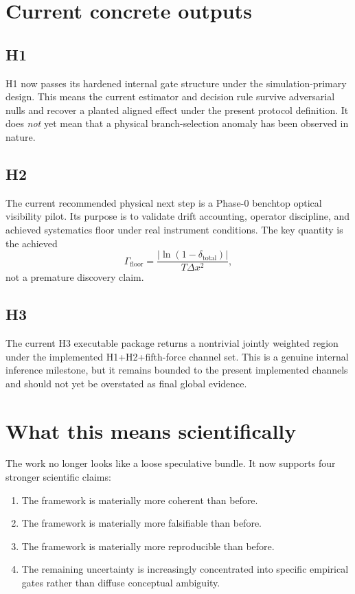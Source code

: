 \documentclass[11pt]{article}
\begin{document}
\section{Current concrete outputs}
\subsection*{H1}
H1 now passes its hardened internal gate structure under the simulation-primary design. This means the current estimator and decision rule survive adversarial nulls and recover a planted aligned effect under the present protocol definition. It does \emph{not} yet mean that a physical branch-selection anomaly has been observed in nature.

\subsection*{H2}
The current recommended physical next step is a Phase-0 benchtop optical visibility pilot. Its purpose is to validate drift accounting, operator discipline, and achieved systematics floor under real instrument conditions. The key quantity is the achieved
\[
\Gamma_{\mathrm{floor}} = \frac{|\ln(1-\delta_{\mathrm{total}})|}{T\Delta x^2},
\]
not a premature discovery claim.

\subsection*{H3}
The current H3 executable package returns a nontrivial jointly weighted region under the implemented H1+H2+fifth-force channel set. This is a genuine internal inference milestone, but it remains bounded to the present implemented channels and should not yet be overstated as final global evidence.

\section{What this means scientifically}
The work no longer looks like a loose speculative bundle. It now supports four stronger scientific claims:
\begin{enumerate}
    \item The framework is materially more coherent than before.
    \item The framework is materially more falsifiable than before.
    \item The framework is materially more reproducible than before.
    \item The remaining uncertainty is increasingly concentrated into specific empirical gates rather than diffuse conceptual ambiguity.
\end{enumerate}
\end{document}
